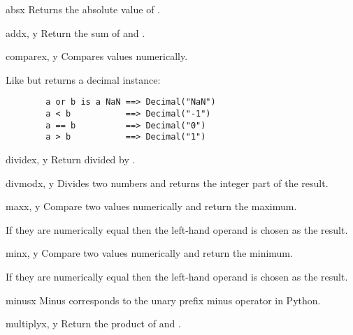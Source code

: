 \begin{methoddesc}{abs}{x}
  Returns the absolute value of .
\end{methoddesc}

\begin{methoddesc}{add}{x, y}
  Return the sum of  and .
\end{methoddesc}
   
\begin{methoddesc}{compare}{x, y}
  Compares values numerically.
  
  Like  but returns a decimal instance:
  \begin{verbatim}
        a or b is a NaN ==> Decimal("NaN")
        a < b           ==> Decimal("-1")
        a == b          ==> Decimal("0")
        a > b           ==> Decimal("1")
  \end{verbatim}                                          
\end{methoddesc}

\begin{methoddesc}{divide}{x, y}
  Return  divided by .
\end{methoddesc}   
  
\begin{methoddesc}{divmod}{x, y}
  Divides two numbers and returns the integer part of the result.
\end{methoddesc} 

\begin{methoddesc}{max}{x, y}
  Compare two values numerically and return the maximum.

  If they are numerically equal then the left-hand operand is chosen as the
  result.
\end{methoddesc} 
 
\begin{methoddesc}{min}{x, y}
  Compare two values numerically and return the minimum.

  If they are numerically equal then the left-hand operand is chosen as the
  result.
\end{methoddesc}

\begin{methoddesc}{minus}{x}
  Minus corresponds to the unary prefix minus operator in Python.
\end{methoddesc}

\begin{methoddesc}{multiply}{x, y}
  Return the product of  and .
\end{methoddesc}

